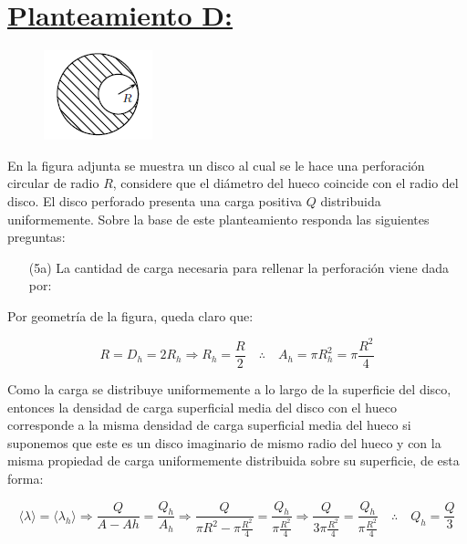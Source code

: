 \documentclass[a4paper,10pt]{article}
\begin{document}
\section*{\underline{Planteamiento D:}}

\begin{figure}
    \vspace{-15pt}
    \centering\includegraphics{Graphics/PlanteamientoD.png}
    \vspace{-20pt}
\end{figure}

En la figura adjunta se muestra un disco al cual se le hace
una perforación circular de radio $R$, considere que el diámetro del hueco coincide
con el radio del disco. El disco perforado presenta una carga positiva $Q$ distribuida
uniformemente. Sobre la base de este planteamiento responda las siguientes
preguntas:

\begin{itemize}
    \item[(5a)] La cantidad de carga necesaria para rellenar la perforación viene dada por:
\end{itemize}

Por geometr\'ia de la figura, queda claro que:

\begin{equation*}
    R=D_{h}=2R_{h}\Longrightarrow R_{h}=\frac{R}{2}
    \quad\therefore\quad A_{h}=\pi R_{h}^{2}=\pi\frac{R^{2}}{4}
\end{equation*}

Como la carga se distribuye uniformemente a lo largo de la superficie del disco,
entonces la densidad de carga superficial media del disco con el hueco corresponde
a la misma densidad de carga superficial media del hueco si suponemos que este
es un disco imaginario de mismo radio del hueco y con la misma propiedad de
carga uniformemente distribuida sobre su superficie, de esta forma:

\begin{equation*}
    \langle\lambda\rangle=\langle\lambda_{h}\rangle
    \Longrightarrow\dfrac{Q}{A-A{h}}=\dfrac{Q_{h}}{A_{h}}
    \Longrightarrow\dfrac{Q}{\pi R^{2}-\pi\frac{R^{2}}{4}}
    =\dfrac{Q_{h}}{\pi\frac{R^{2}}{4}}
    \Longrightarrow\dfrac{Q}{3\pi\frac{R^{2}}{4}}=\dfrac{Q_{h}}{\pi\frac{R^{2}}{4}}
    \quad\therefore\quad\boxed{Q_{h}=\frac{Q}{3}}
\end{equation*}
\end{document}

